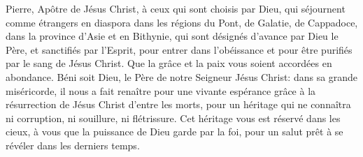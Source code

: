 Pierre, Apôtre de Jésus Christ, à ceux qui sont choisis par Dieu,
	qui séjournent comme étrangers en diaspora dans les régions du Pont,
	de Galatie, de Cappadoce, dans la province d’Asie et en Bithynie,
	qui sont désignés d’avance par Dieu le Père, et sanctifiés par l’Esprit,
	pour entrer dans l’obéissance
		et pour être purifiés par le sang de Jésus Christ.
Que la grâce et la paix vous soient accordées en abondance.
Béni soit Dieu, le Père de notre Seigneur Jésus Christ:
	dans sa grande miséricorde,
	il nous a fait renaître pour une vivante espérance
	grâce à la résurrection de Jésus Christ d’entre les morts,
	pour un héritage qui ne connaîtra ni corruption,
		ni souillure, ni flétrissure.
Cet héritage vous est réservé dans les cieux,
	à vous que la puissance de Dieu garde par la foi,
	pour un salut prêt à se révéler dans les derniers temps.
